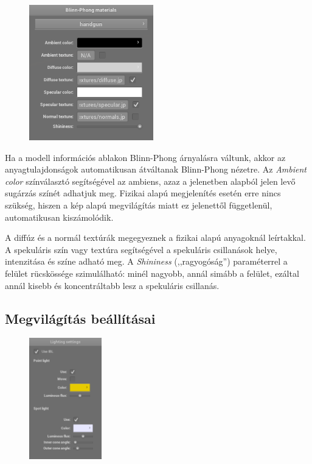 \begin{figure}
    \vspace{-23pt}
    \includegraphics[width=0.48\textwidth]{images/bp_materials.png}
    \vspace{-20pt}
\end{figure}

Ha a modell információs ablakon Blinn-Phong árnyalásra váltunk, akkor az anyagtulajdonságok automatikusan átváltanak Blinn-Phong nézetre. Az \textit{Ambient color} színválasztó segítségével az ambiens, azaz a jelenetben alapból jelen levő sugárzás színét adhatjuk meg. Fizikai alapú megjelenítés esetén erre nincs szükség, hiszen a kép alapú megvilágítás miatt ez jelenettől függetlenül, automatikusan kiszámolódik.

A diffúz és a normál textúrák megegyeznek a fizikai alapú anyagoknál leírtakkal. A spekuláris szín vagy textúra segítségével a spekuláris csillanások helye, intenzitása és színe adható meg. A \textit{Shininess} (,,ragyogóság'') paraméterrel a felület rücskössége szimulálható: minél nagyobb, annál simább a felület, ezáltal annál kisebb és koncentráltabb lesz a spekuláris csillanás.

\clearpage

\subsection{Megvilágítás beállításai}

\begin{figure}
    \vspace{-23pt}
    \includegraphics[width=0.28\textwidth]{images/lighting_settings.png}
    \vspace{-20pt}
\end{figure}


